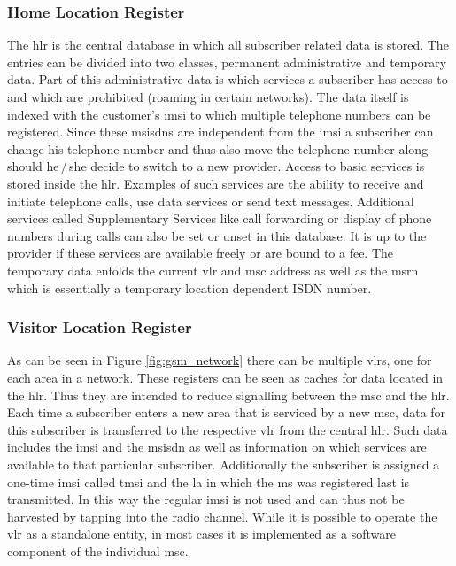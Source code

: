 \subsubsection{Home Location Register}
The \gls{hlr} is the central database in which all subscriber related data is stored.
The entries can be divided into two classes, permanent administrative and temporary data.
Part of this administrative data is which services a subscriber has access to and which are prohibited (\eg roaming in certain networks).
The data itself is indexed with the customer's \gls{imsi} to which multiple telephone numbers can be registered.
Since these \glspl{msisdn} are independent from the \gls{imsi} a subscriber can change his telephone number and thus also move the telephone number along should he\,/\,she decide to switch to a new provider.
Access to basic services is stored inside the \gls{hlr}.
Examples of such services are the ability to receive and initiate telephone calls, use data services or send text messages.
Additional services called Supplementary Services like call forwarding or display of phone numbers during calls can also be set or unset in this database.
It is up to the provider if these services are available freely or are bound to a fee.
The temporary data enfolds the current \gls{vlr} and \gls{msc} address as well as the \gls{msrn} which is essentially a temporary location dependent ISDN number.

\subsubsection{Visitor Location Register}
As can be seen in Figure \ref{fig:gsm_network} there can be multiple \glspl{vlr}, one for each area in a network.
These registers can be seen as caches for data located in the \gls{hlr}.
Thus they are intended to reduce signalling between the \gls{msc} and the \gls{hlr}.
Each time a subscriber enters a new area that is serviced by a new \gls{msc}, data for this subscriber is transferred to the respective \gls{vlr} from the central \gls{hlr}.
Such data includes the \gls{imsi} and the \gls{msisdn} as well as information on which services are available to that particular subscriber.
Additionally the subscriber is assigned a one-time \gls{imsi} called \gls{tmsi} and the \gls{la} in which the \gls{ms} was registered last is transmitted.
In this way the regular \gls{imsi} is not used and can thus not be harvested by tapping into the radio channel.
While it is possible to operate the \gls{vlr} as a standalone entity, in most cases it is implemented as a software component of the individual \gls{msc}.

